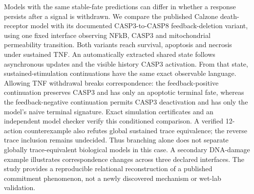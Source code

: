 Models with the same stable-fate predictions can differ in whether a response
persists after a signal is withdrawn. We compare the published Calzone
death-receptor model with its documented CASP3-to-CASP8 feedback-deletion
variant, using one fixed interface observing NFkB, CASP3 and mitochondrial
permeability transition. Both variants reach survival, apoptosis and necrosis
under sustained TNF. An automatically extracted shared state follows
\DRDepth{} asynchronous updates and the visible history CASP3 activation.
From that state, sustained-stimulation continuations have the same exact
observable language. Allowing TNF withdrawal breaks correspondence: the
feedback-positive continuation preserves CASP3 and has only an apoptotic
terminal fate, whereas the feedback-negative continuation permits CASP3
deactivation and has only the model's naive terminal signature. Exact
simulation certificates and an independent model checker verify this
conditioned comparison. A verified 12-action counterexample also refutes
global sustained trace equivalence; the reverse trace inclusion remains
undecided. Thus branching alone does not separate globally trace-equivalent
biological models in this case. A secondary
DNA-damage example illustrates correspondence changes across three declared
interfaces. The study provides a reproducible relational reconstruction of a
published commitment phenomenon, not a newly discovered mechanism or wet-lab
validation.

